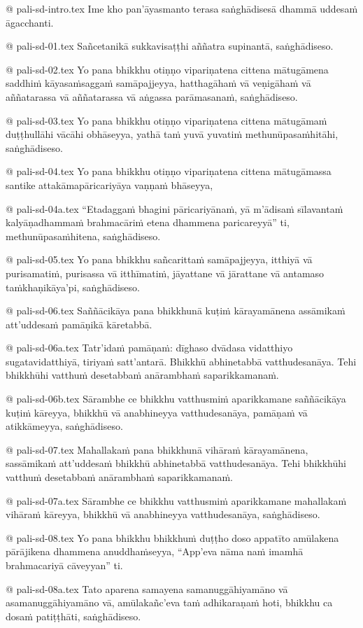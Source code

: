 @ pali-sd-intro.tex
Ime kho pan’āyasmanto terasa saṅghādisesā dhammā uddesaṁ āgacchanti.

@ pali-sd-01.tex
Sañcetanikā sukkavisaṭṭhi aññatra supinantā, saṅghādiseso.

@ pali-sd-02.tex
Yo pana bhikkhu otiṇṇo vipariṇatena cittena mātugāmena saddhiṁ kāyasaṁsaggaṁ samāpajjeyya, hatthagāhaṁ vā veṇigāhaṁ vā aññatarassa vā aññatarassa vā aṅgassa parāmasanaṁ, saṅghādiseso.

@ pali-sd-03.tex
Yo pana bhikkhu otiṇṇo vipariṇatena cittena mātugāmaṁ duṭṭhullāhi vācāhi obhāseyya, yathā taṁ yuvā yuvatiṁ methunūpasaṁhitāhi, saṅghādiseso.

@ pali-sd-04.tex
Yo pana bhikkhu otiṇṇo vipariṇatena cittena mātugāmassa santike attakāmapāricariyāya vaṇṇaṁ bhāseyya, 

@ pali-sd-04a.tex
“Etadaggaṁ bhagini pāricariyānaṁ, yā m’ādisaṁ sīlavantaṁ kalyāṇadhammaṁ brahmacāriṁ etena dhammena paricareyyā” ti, methunūpasaṁhitena, saṅghādiseso.

@ pali-sd-05.tex
Yo pana bhikkhu sañcarittaṁ samāpajjeyya, itthiyā vā purisamatiṁ, purisassa vā itthīmatiṁ, jāyattane vā jārattane vā antamaso taṁkhaṇikāya’pi, saṅghādiseso.

@ pali-sd-06.tex
Saññācikāya pana bhikkhunā kuṭiṁ kārayamānena assāmikaṁ att’uddesaṁ pamāṇikā kāretabbā. 

@ pali-sd-06a.tex
Tatr’idaṁ pamāṇaṁ: dīghaso dvādasa vidatthiyo sugatavidatthiyā, tiriyaṁ satt’antarā. Bhikkhū abhinetabbā vatthudesanāya. Tehi bhikkhūhi vatthuṁ desetabbaṁ anārambhaṁ saparikkamanaṁ. 

@ pali-sd-06b.tex
Sārambhe ce bhikkhu vatthusmiṁ aparikkamane saññācikāya kuṭiṁ kāreyya, bhikkhū vā anabhineyya vatthudesanāya, pamāṇaṁ vā atikkāmeyya, saṅghādiseso.

@ pali-sd-07.tex
Mahallakaṁ pana bhikkhunā vihāraṁ kārayamānena, sassāmikaṁ att’uddesaṁ bhikkhū abhinetabbā vatthudesanāya. Tehi bhikkhūhi vatthuṁ desetabbaṁ anārambhaṁ saparikkamanaṁ.

@ pali-sd-07a.tex
Sārambhe ce bhikkhu vatthusmiṁ aparikkamane mahallakaṁ vihāraṁ kāreyya, bhikkhū vā anabhineyya vatthudesanāya, saṅghādiseso.

@ pali-sd-08.tex
Yo pana bhikkhu bhikkhuṁ duṭṭho doso appatīto amūlakena pārājikena dhammena anuddhaṁseyya, “App’eva nāma naṁ imamhā brahmacariyā cāveyyan” ti.

@ pali-sd-08a.tex
Tato aparena samayena samanuggāhiyamāno vā asamanuggāhiyamāno vā, amūlakañc’eva taṁ adhikaraṇaṁ hoti, bhikkhu ca dosaṁ patiṭṭhāti, saṅghādiseso.

